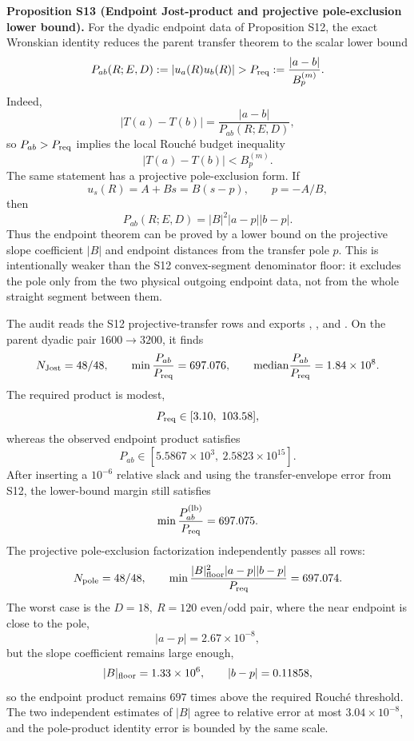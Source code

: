 \documentclass[aps,prd,onecolumn,notitlepage,nofootinbib,superscriptaddress,11pt,floatfix]{revtex4-2}
\begin{document}
\medskip\noindent\textbf{Proposition S13 (Endpoint Jost-product and projective pole-exclusion lower bound).}
For the dyadic endpoint data of Proposition S12, the exact Wronskian identity reduces the parent transfer theorem to the scalar lower bound
\[
P_{ab}(R;E,D):=|u_a(R)u_b(R)|
>
P_{\rm req}:=\frac{|a-b|}{B_p^{(m)}} .
\]
Indeed,
\[
|T(a)-T(b)|=\frac{|a-b|}{P_{ab}(R;E,D)},
\]
so \(P_{ab}>P_{\rm req}\) implies the local Rouché budget inequality
\[
|T(a)-T(b)|<B_p^{(m)} .
\]
The same statement has a projective pole-exclusion form.  If
\[
u_s(R)=A+Bs=B(s-p),\qquad p=-A/B,
\]
then
\[
P_{ab}(R;E,D)=|B|^2|a-p||b-p|.
\]
Thus the endpoint theorem can be proved by a lower bound on the projective slope coefficient \(|B|\) and endpoint distances from the transfer pole \(p\).  This is intentionally weaker than the S12 convex-segment denominator floor: it excludes the pole only from the two physical outgoing endpoint data, not from the whole straight segment between them.

The audit  reads the S12 projective-transfer rows and exports , , and .  On the parent dyadic pair \(1600\to3200\), it finds
\[
N_{\rm Jost}=48/48,\qquad
\min\frac{P_{ab}}{P_{\rm req}}=697.076,
\qquad
{\rm median}\frac{P_{ab}}{P_{\rm req}}=1.84\times10^8 .
\]
The required product is modest,
\[
P_{\rm req}\in[3.10,\ 103.58],
\]
whereas the observed endpoint product satisfies
\[
P_{ab}\in[5.5867\times10^3,\ 2.5823\times10^{15}].
\]
After inserting a \(10^{-6}\) relative slack and using the transfer-envelope error from S12, the lower-bound margin still satisfies
\[
\min\frac{P_{ab}^{\rm(lb)}}{P_{\rm req}}=697.075 .
\]
The projective pole-exclusion factorization independently passes all rows:
\[
N_{\rm pole}=48/48,\qquad
\min\frac{|B|_{\rm floor}^2|a-p||b-p|}{P_{\rm req}}=697.074 .
\]
The worst case is the \(D=18,\ R=120\) even/odd pair, where the near endpoint is close to the pole,
\[
|a-p|=2.67\times10^{-8},
\]
but the slope coefficient remains large enough,
\[
|B|_{\rm floor}=1.33\times10^6,\qquad
|b-p|=0.11858,
\]
so the endpoint product remains \(697\) times above the required Rouché threshold.  The two independent estimates of \(|B|\) agree to relative error at most \(3.04\times10^{-8}\), and the pole-product identity error is bounded by the same scale.
\end{document}
